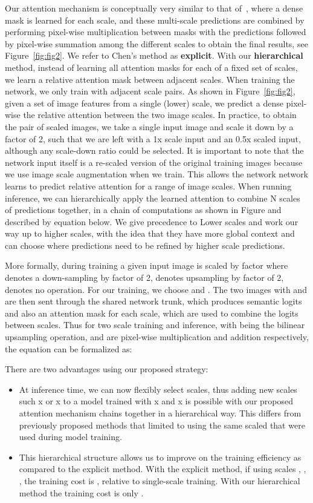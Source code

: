 \documentclass{article}
\begin{document}
Our attention mechanism is conceptually very similar to that of~\cite{chen2015attention}, where a dense mask is learned for each scale, and these multi-scale predictions are combined by performing pixel-wise multiplication between masks with the predictions followed by pixel-wise summation among the different scales to obtain the final results, see Figure~\ref{fig:fig2}. We refer to Chen's method as \textbf{explicit}. With our \textbf{hierarchical} method, instead of learning all attention masks for each of a fixed set of scales, we learn a relative attention mask between adjacent scales. When training the network, we only train with adjacent scale pairs. As shown in Figure~\ref{fig:fig2}, given a set of image features from a single (lower) scale, we predict a dense pixel-wise the relative attention between the two image scales. In practice, to obtain the pair of scaled images, we take a single input image and scale it down by a factor of 2, such that we are left with a 1x scale input and an 0.5x scaled input, although any scale-down ratio could be selected. It is important to note that the network input itself is a re-scaled version of the original training images because we use image scale augmentation when we train. This allows the network network learns to predict relative attention for a range of image scales. When running inference, we can hierarchically apply the learned attention to combine N scales of predictions together, in a chain of computations as shown in Figure and described by equation below. We give precedence to Lower scales and work our way up to higher scales, with the idea that they have more global context and can choose where predictions need to be refined by higher scale predictions.

More formally, during training a given input image is scaled by factor  where  denotes a down-sampling by factor of 2,  denotes upsampling by factor of 2,  denotes no operation. For our training, we choose  and . The two images with  and  are then sent through the shared network trunk, which produces semantic logits  and also an attention mask for each scale, which are used to combine the logits  between scales. Thus for two scale training and inference, with  being the bilinear upsampling operation,   and  are pixel-wise multiplication and addition respectively, the equation can be formalized as:


There are two advantages using our proposed strategy:
\begin{itemize}
 \item At inference time, we can now flexibly select scales, thus adding new scales such x or x to a model trained with x and x  is possible with our proposed attention mechanism chains together in a hierarchical way. This differs from previously proposed methods that limited to using the same scaled that were used during model training.
 
 \item This hierarchical structure allows us to improve on the training efficiency as compared to the explicit method. With the explicit method, if using scales , , , the training cost is , relative to single-scale training. With our hierarchical method the training cost is only .
\end{itemize}
 
\end{document}
